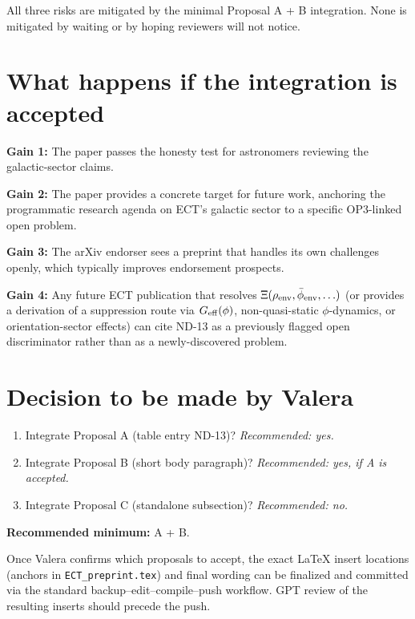 \documentclass[11pt]{article}
\begin{document}
All three risks are mitigated by the minimal Proposal A + B integration.
None is mitigated by waiting or by hoping reviewers will not notice.

\section{What happens if the integration is accepted}

\textbf{Gain 1:} The paper passes the honesty test for astronomers
reviewing the galactic-sector claims.

\textbf{Gain 2:} The paper provides a concrete target for future work,
anchoring the programmatic research agenda on ECT's galactic sector
to a specific OP3-linked open problem.

\textbf{Gain 3:} The arXiv endorser sees a preprint that handles its
own challenges openly, which typically improves endorsement prospects.

\textbf{Gain 4:} Any future ECT publication that resolves
$\Xi(\rho_{\rm env},\bar\phi_{\rm env},\ldots)$ (or provides a
derivation of a suppression route via $G_{\rm eff}(\phi)$,
non-quasi-static $\phi$-dynamics, or orientation-sector effects) can
cite ND-13 as a previously flagged open discriminator rather than as
a newly-discovered problem.

\section{Decision to be made by Valera}

\begin{enumerate}
\item[Decision 1:] Integrate Proposal A (table entry ND-13)?
\emph{Recommended: yes.}

\item[Decision 2:] Integrate Proposal B (short body paragraph)?
\emph{Recommended: yes, if A is accepted.}

\item[Decision 3:] Integrate Proposal C (standalone subsection)?
\emph{Recommended: no.}
\end{enumerate}

\textbf{Recommended minimum:} A + B.

Once Valera confirms which proposals to accept, the exact LaTeX insert
locations (anchors in {\tt ECT\_preprint.tex}) and final wording can
be finalized and committed via the standard backup--edit--compile--push
workflow. GPT review of the resulting inserts should precede the push.
\end{document}
